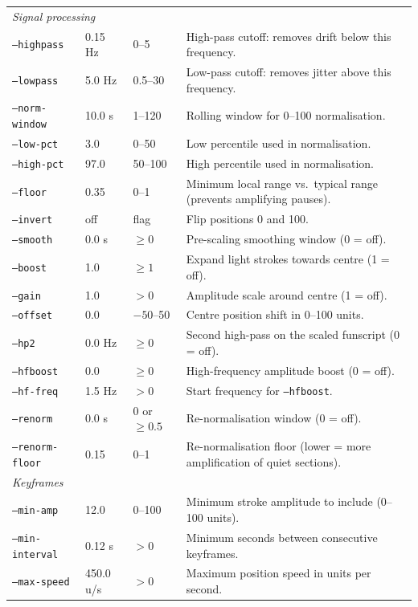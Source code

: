\documentclass[11pt,a4paper]{article}
\newcommand{\code}[1]{\texttt{#1}}
\begin{document}
\begin{longtable}{p{3.2cm} p{2.2cm} p{1.5cm} p{7.5cm}}
  \multicolumn{4}{l}{\textit{Signal processing}} \\
  \code{--highpass}      & 0.15 Hz   & 0--5       & High-pass cutoff: removes drift below this frequency. \\
  \code{--lowpass}       & 5.0 Hz    & 0.5--30    & Low-pass cutoff: removes jitter above this frequency. \\
  \code{--norm-window}   & 10.0 s    & 1--120     & Rolling window for 0--100 normalisation. \\
  \code{--low-pct}       & 3.0       & 0--50      & Low percentile used in normalisation. \\
  \code{--high-pct}      & 97.0      & 50--100    & High percentile used in normalisation. \\
  \code{--floor}         & 0.35      & 0--1       & Minimum local range vs.\ typical range (prevents amplifying pauses). \\
  \code{--invert}        & off       & flag       & Flip positions 0 and 100. \\
  \code{--smooth}        & 0.0 s     & $\ge 0$    & Pre-scaling smoothing window (0 = off). \\
  \code{--boost}         & 1.0       & $\ge 1$    & Expand light strokes towards centre (1 = off). \\
  \code{--gain}          & 1.0       & $>0$       & Amplitude scale around centre (1 = off). \\
  \code{--offset}        & 0.0       & $-50$--50  & Centre position shift in 0--100 units. \\
  \code{--hp2}           & 0.0 Hz    & $\ge 0$    & Second high-pass on the scaled funscript (0 = off). \\
  \code{--hfboost}       & 0.0       & $\ge 0$    & High-frequency amplitude boost (0 = off). \\
  \code{--hf-freq}       & 1.5 Hz    & $>0$       & Start frequency for \code{--hfboost}. \\
  \code{--renorm}        & 0.0 s     & 0 or $\ge 0.5$ & Re-normalisation window (0 = off). \\
  \code{--renorm-floor}  & 0.15      & 0--1       & Re-normalisation floor (lower = more amplification of quiet sections). \\

  \multicolumn{4}{l}{\textit{Keyframes}} \\
  \code{--min-amp}       & 12.0      & 0--100     & Minimum stroke amplitude to include (0--100 units). \\
  \code{--min-interval}  & 0.12 s    & $>0$       & Minimum seconds between consecutive keyframes. \\
  \code{--max-speed}     & 450.0 u/s & $>0$       & Maximum position speed in units per second. \\


\end{longtable}
\end{document}
